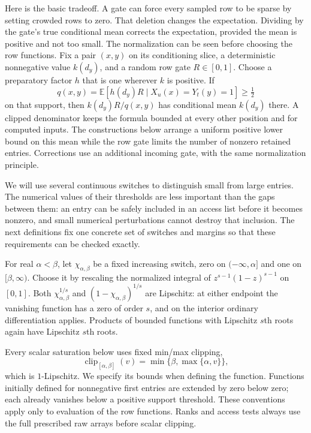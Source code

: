 Here is the basic tradeoff. A gate can force every sampled row to be sparse by setting crowded rows to zero. That deletion changes the expectation. Dividing by the gate's true conditional mean corrects the expectation, provided the mean is positive and not too small. The normalization can be seen before choosing the row functions.  Fix a
pair $(x,y)$ on its conditioning slice, a deterministic nonnegative value
$k(d_y)$, and a random row gate $R\in[0,1]$.  Choose a preparatory factor
$h$ that is one wherever $k$ is positive.  If
\[
 q(x,y)=\mathbb E[h(d_y)R\mid X_u(x)=Y_t(y)=1]\ge\tfrac12
\]
on that support, then $k(d_y)R/q(x,y)$ has conditional mean $k(d_y)$
there.  A clipped denominator keeps the formula bounded at every other
position and for computed inputs.  The constructions below arrange a
uniform positive lower bound on this mean while the row gate limits the
number of nonzero retained entries.  Corrections use an additional incoming
gate, with the same normalization principle.

We will use several continuous switches to distinguish small from large entries. The numerical values of their thresholds are less important than the gaps between them: an entry can be safely included in an access list before it becomes nonzero, and small numerical perturbations cannot destroy that inclusion. The next definitions fix one concrete set of switches and margins so that these requirements can be checked exactly.

For real $\alpha<\beta$, let $\chi_{\alpha,\beta}$ be a fixed increasing
switch, zero on $(-\infty,\alpha]$ and one on $[\beta,\infty)$.
Choose it by rescaling the normalized integral of
$z^{s-1}(1-z)^{s-1}$ on $[0,1]$.
Both $\chi_{\alpha,\beta}^{1/s}$ and
$(1-\chi_{\alpha,\beta})^{1/s}$ are Lipschitz: at either endpoint the
vanishing function has a zero of order $s$, and on the interior ordinary
differentiation applies.  Products of bounded functions with Lipschitz
$s$th roots again have Lipschitz $s$th roots.

Every scalar saturation below uses fixed min/max clipping,
\[
 \operatorname{clip}_{[\alpha,\beta]}(v)
   =\min\{\beta,\max\{\alpha,v\}\},
\]
which is $1$-Lipschitz.  We specify its bounds when defining the function.
Functions initially defined for nonnegative first entries are extended
by zero below zero; each already vanishes below a positive support
threshold.  These conventions apply only to evaluation of the row
functions.  Ranks and access tests always use the full prescribed raw
arrays before scalar clipping.

